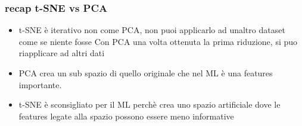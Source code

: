 \subsubsection{recap t-SNE vs PCA}
\begin{itemize}
    \item t-SNE è iterativo non come PCA, non puoi applicarlo ad unaltro dataset come se niente fosse
    Con PCA una volta ottenuta la prima riduzione, si puo riapplicare ad altri dati
    \item PCA crea un sub spazio di quello originale che nel ML è una features importante.

    \item t-SNE è sconsigliato per il ML perchè crea uno spazio artificiale
    dove le features legate alla spazio possono essere meno informative
\end{itemize}






















